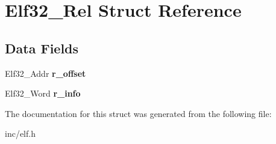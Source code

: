 \hypertarget{structElf32__Rel}{}\section{Elf32\+\_\+\+Rel Struct Reference}
\label{structElf32__Rel}
\subsection*{Data Fields}
\begin{DoxyCompactItemize}
\item 
Elf32\+\_\+\+Addr {\bfseries r\+\_\+offset}\hypertarget{structElf32__Rel_addcf5ef67ababeb4940889e912c11eff}{}\label{structElf32__Rel_addcf5ef67ababeb4940889e912c11eff}

\item 
Elf32\+\_\+\+Word {\bfseries r\+\_\+info}\hypertarget{structElf32__Rel_a81c52bb1589056c5d37d58b9bfe2a046}{}\label{structElf32__Rel_a81c52bb1589056c5d37d58b9bfe2a046}

\end{DoxyCompactItemize}


The documentation for this struct was generated from the following file\+:\begin{DoxyCompactItemize}
\item 
inc/elf.\+h\end{DoxyCompactItemize}
